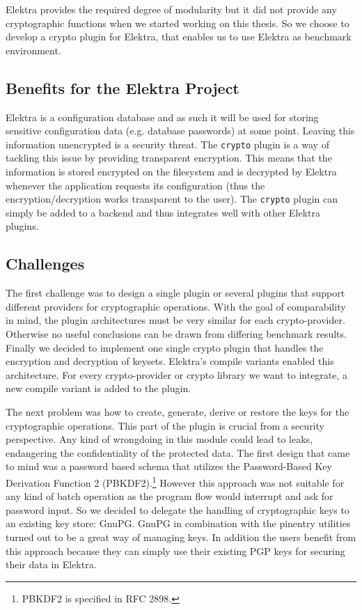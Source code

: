 Elektra provides the required degree of modularity but it did not provide any cryptographic functions when we started working on this thesis.
So we choose to develop a crypto plugin for Elektra, that enables us to use Elektra as benchmark environment.

\subsection{Benefits for the Elektra Project}

Elektra is a configuration database and as such it will be used for storing sensitive configuration data (e.g. database passwords) at some point.
Leaving this information unencrypted is a security threat.
The \texttt{crypto} plugin is a way of tackling this issue by providing transparent encryption.
This means that the information is stored encrypted on the filesystem and is decrypted by Elektra whenever the application requests its configuration (thus the encryption/decryption works transparent to the user). The \texttt{crypto} plugin can simply be added to a backend and thus integrates well with other Elektra plugins.

\subsection{Challenges}

The first challenge was to design a single plugin or several plugins that support different providers for cryptographic operations.
With the goal of comparability in mind, the plugin architectures must be very similar for each crypto-provider.
Otherwise no useful conclusions can be drawn from differing benchmark results.
Finally we decided to implement one single crypto plugin that handles the encryption and decryption of keysets.
Elektra's compile variants enabled this architecture.
For every crypto-provider or crypto library we want to integrate, a new compile variant is added to the plugin.

The next problem was how to create, generate, derive or restore the keys for the cryptographic operations.
This part of the plugin is crucial from a security perspective.
Any kind of wrongdoing in this module could lead to leaks, endangering the confidentiality of the protected data.
The first design that came to mind was a password based schema that utilizes the Password-Based Key Derivation Function 2 (PBKDF2).\footnote{PBKDF2 is specified in RFC 2898.}
However this approach was not suitable for any kind of batch operation as the program flow would interrupt and ask for password input.
So we decided to delegate the handling of cryptographic keys to an existing key store: GnuPG.
GnuPG in combination with the pinentry utilities turned out to be a great way of managing keys.
In addition the users benefit from this approach because they can simply use their existing PGP keys for securing their data in Elektra.

